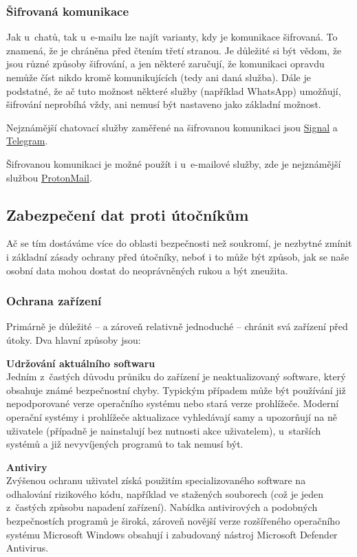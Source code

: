 \subsubsection*{Šifrovaná komunikace}
Jak u~chatů, tak u~e-mailu lze najít varianty, kdy je komunikace šifrovaná. To znamená, že je chráněna před čtením třetí stranou. Je důležité si být vědom, že jsou různé způsoby šifrování, a jen některé zaručují, že komunikaci opravdu nemůže číst nikdo kromě komunikujících (tedy ani daná služba). Dále je podstatné, že ač tuto možnost některé služby (například WhatsApp) umožňují, šifrování neprobíhá vždy, ani nemusí být nastaveno jako základní možnost.

Nejznámější chatovací služby zaměřené na šifrovanou komunikaci jsou \href{https://signal.org/}{Signal} a \href{https://telegram.org}{Telegram}.

Šifrovanou komunikaci je možné použít i u~e-mailové služby, zde je nejznámější službou \href{https://protonmail.com}{ProtonMail}. 


\subsection{Zabezpečení dat proti útočníkům}
Ač se tím dostáváme více do oblasti bezpečnosti než soukromí, je nezbytné zmínit i základní zásady ochrany před útočníky, neboť i to může být způsob, jak se naše osobní data mohou dostat do neoprávněných rukou a být zneužita.

\subsubsection*{Ochrana zařízení}
Primárně je důležité -- a zároveň relativně jednoduché -- chránit svá zařízení před útoky. Dva hlavní způsoby jsou:

\textbf{Udržování aktuálního softwaru}\\
Jedním z~častých důvodu průniku do zařízení je neaktualizovaný software, který obsahuje známé bezpečnostní chyby. Typickým případem může být používání již nepodporované verze operačního systému nebo stará verze prohlížeče. Moderní operační systémy i prohlížeče aktualizace vyhledávají samy a upozorňují na ně uživatele (případně je nainstalují bez nutnosti akce uživatelem), u~starších systémů a již nevyvíjených programů to tak nemusí být.

\textbf{Antiviry}\\
Zvýšenou ochranu uživatel získá použitím specializovaného software na odhalování rizikového kódu, například ve stažených souborech (což je jeden z~častých způsobu napadení zařízení). Nabídka antivirových a podobných bezpečnostích programů je široká, zároveň novější verze rozšířeného operačního systému Microsoft Windows obsahují i zabudovaný nástroj Microsoft Defender Antivirus.


